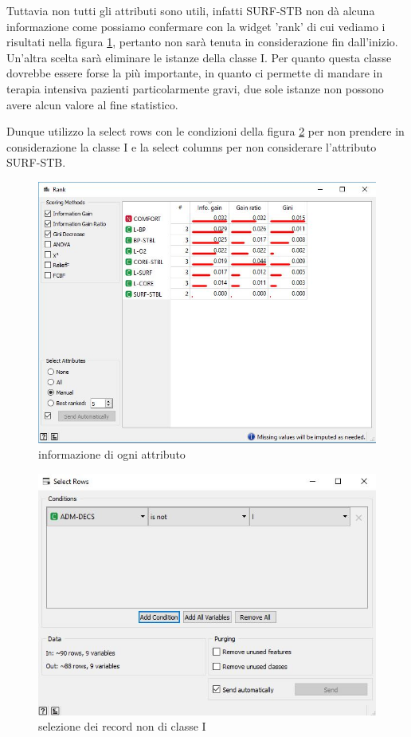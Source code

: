 \documentclass[a4paper, 12p]{report}
\begin{document}
Tuttavia non tutti gli attributi sono utili, infatti SURF-STB non dà alcuna informazione come possiamo confermare con la widget 'rank' di cui vediamo i risultati nella figura \ref{fig:1}, pertanto non sarà tenuta in considerazione fin dall'inizio.
Un'altra scelta sarà eliminare le istanze della classe I. Per quanto questa classe dovrebbe essere forse la più importante, in quanto ci permette di mandare in terapia intensiva pazienti particolarmente gravi, due sole istanze non possono avere alcun valore al fine statistico. 

Dunque utilizzo la select rows con le condizioni della figura \ref{fig:2} per non prendere in considerazione la classe I e la select columns per non considerare l'attributo SURF-STB.
\begin{figure}	
	\centering
	\includegraphics[scale = 0.5]{img/rank.JPG}
	\caption{informazione di ogni attributo }\label{fig:1}
\end{figure}
\begin{figure}
	\centering
	\includegraphics[scale = 0.4]{img/rows.JPG}
	\caption{selezione dei record non di classe I}	\label{fig:2}
\end{figure}	
\end{document}

